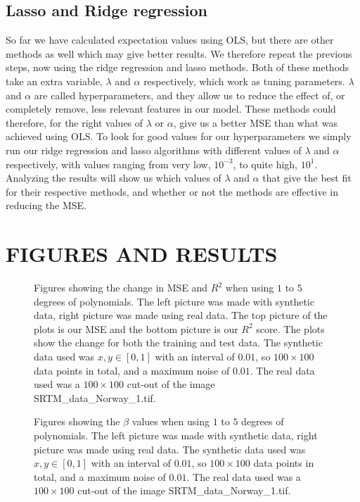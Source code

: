 \documentclass[english,notitlepage,reprint,nofootinbib]{revtex4-1}  %
\begin{document}
\subsection{Lasso and Ridge regression}\label{subsec:LASSO_RIDGE}
So far we have calculated expectation values using OLS, but there are other methods as well which may give better results. We therefore repeat the previous steps, now using the ridge regression and lasso methods. Both of these methods take an extra variable, $\lambda$ and $\alpha$ respectively, which work as tuning parameters. $\lambda$ and $\alpha$ are called hyperparameters, and they allow us to reduce the effect of, or completely remove, less relevant features in our model. These methods could therefore, for the right values of $\lambda$ or $\alpha$, give us a better MSE than what was achieved using OLS. To look for good values for our hyperparameters we simply run our ridge regression and lasso algorithms with different values of $\lambda$ and $\alpha$ respectively, with values ranging from very low, $10^{-3}$, to quite high, $10^{1}$. Analyzing the results will show us which values of $\lambda$ and $\alpha$ that give the best fit for their respective methods, and whether or not the methods are effective in reducing the MSE. 

\section{FIGURES AND RESULTS}\label{sec: FIGURES}

\begin{figure*}
    \centering
    \qquad
    \caption{Figures showing the change in MSE and $R^2$ when using $1$ to $5$ degrees of polynomials. The left picture was made with synthetic data, right picture was made using real data.
    The top picture of the plots is our MSE and the bottom picture is our $R^2$ score. The plots show the change for both the training and test data. 
    The synthetic data used was $x,y \in [0,1]$ with an interval of $0.01$, so $100 \times 100$ data points in total, and a maximum noise of $0.01$. The real data used was a $100 \times 100$ cut-out of the image SRTM\_data\_Norway\_1.tif.}
    \label{fig: OLS}
\end{figure*}

\begin{figure*}
    \centering
    \qquad
    \caption{Figures showing the $\beta$ values when using $1$ to $5$ degrees of polynomials. The left picture was made with synthetic data, right picture was made using real data.
    The synthetic data used was $x,y \in [0,1]$ with an interval of $0.01$, so $100 \times 100$ data points in total, and a maximum noise of $0.01$. The real data used was a $100 \times 100$ cut-out of the image SRTM\_data\_Norway\_1.tif.}
    \label{fig: BETA_VALUES}
\end{figure*}
\end{document}
